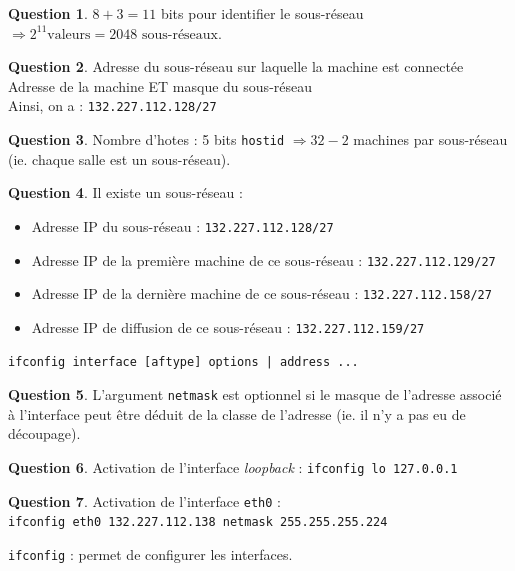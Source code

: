 \documentclass[11pt,english,french]{scrreprt}
\theoremstyle{remark}
\theoremstyle{definition}
\newtheorem{ques*}{Question}[subsection]
\begin{document}
\begin{ques*}
$8+3 = 11$ bits pour identifier le sous-réseau $\Rightarrow 2^{11} \textrm{valeurs} = 2048 \textrm{ sous-réseaux.}$
\end{ques*}

\begin{ques*}
Adresse du sous-réseau sur laquelle la machine est connectée\\
Adresse de la machine ET masque du sous-réseau\\
Ainsi, on a : \lstinline!132.227.112.128/27!
\end{ques*}

\begin{ques*}
Nombre d'hotes : 5 bits \lstinline!hostid! $\Rightarrow 32 - 2$ machines par sous-réseau (ie. chaque salle est un sous-réseau).
\end{ques*}

\begin{ques*}
Il existe un sous-réseau : \begin{itemize}
	\item Adresse IP du sous-réseau : \lstinline!132.227.112.128/27!
	\item Adresse IP de la première machine de ce sous-réseau : \lstinline!132.227.112.129/27!
	\item Adresse IP de la dernière machine de ce sous-réseau : \lstinline!132.227.112.158/27!
	\item Adresse IP de diffusion de ce sous-réseau : \lstinline!132.227.112.159/27!
\end{itemize}
\end{ques*}

\begin{lstlisting}
ifconfig interface [aftype] options | address ...
\end{lstlisting}

\begin{ques*}
L'argument \lstinline!netmask! est optionnel si le masque de l'adresse associé à l'interface peut être déduit de la classe de l'adresse (ie. il n'y a pas eu de découpage).
\end{ques*}

\begin{ques*}
Activation de l'interface \emph{loopback} : \lstinline!ifconfig lo 127.0.0.1!
\end{ques*}

\begin{ques*}
Activation de l'interface \lstinline!eth0! : \\
\lstinline!ifconfig eth0 132.227.112.138 netmask 255.255.255.224!

\lstinline!ifconfig! : permet de configurer les interfaces.
\end{ques*}
\end{document}

